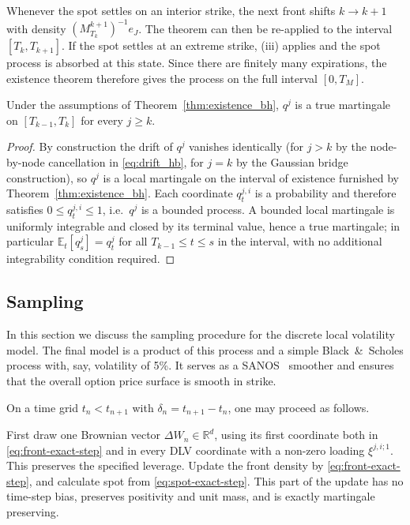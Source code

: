 \documentclass[smallextended,envcountsame,envcountsect]{svjour3}
\begin{document}
Whenever the spot settles on an interior strike, the next front shifts $k \rightarrow k +1 $ with density $(M^{k+1}_{T_k})^{-1}e_J$. The theorem can then be re-applied to the interval $[T_k, T_{k+1}]$. If the spot settles at an extreme strike, (iii) applies and the spot process is absorbed at this state. Since there are finitely many expirations, the existence theorem therefore gives the process on the full interval $[0, T_M]$. 

\begin{corollary}
\label{cor:true_martingale_mw}
Under the assumptions of Theorem~\ref{thm:existence_bh}, $q^j$ is a true martingale on $[T_{k-1},T_k]$ for every $j\geq k$.
\end{corollary}
\begin{proof}
By construction the drift of $q^j$ vanishes identically (for $j>k$ by the node-by-node cancellation in \eqref{eq:drift_hb}, for $j=k$ by the Gaussian bridge construction), so $q^j$ is a local martingale on the interval of existence furnished by Theorem~\ref{thm:existence_bh}. Each coordinate $q_t^{j,i}$ is a probability and therefore satisfies $0\leq q_t^{j,i}\leq 1$, i.e.\ $q^j$ is a bounded process. A bounded local martingale is uniformly integrable and closed by its terminal value, hence a true martingale; in particular $\mathbb E_t[q_s^j]=q_t^j$ for all $T_{k-1}\leq t\leq s$ in the interval, with no additional integrability condition required.
\end{proof}

\subsection{Sampling}
\label{sec:sampling}

  In this section we discuss the sampling procedure for the discrete local volatility model. The final model is a product of this 
  process and a simple Black~\&~Scholes process with, say, volatility of 5\%. It serves as a SANOS~\citep{SANOS2026} smoother and ensures
  that the overall option price surface is smooth in strike.

   On a time grid
  $t_n<t_{n+1}$ with $\delta_n=t_{n+1}-t_n$, one may proceed as follows.

  First draw one Brownian vector $\Delta W_n\in\mathbb R^d$, using its first
  coordinate both in \eqref{eq:front-exact-step} and in every DLV coordinate
  with a non-zero loading $\xi^{j,i;1}$. This preserves the specified leverage.
  Update the front density by \eqref{eq:front-exact-step}, and calculate spot
  from \eqref{eq:spot-exact-step}. This part of the update has no time-step
  bias, preserves positivity and unit mass, and is exactly martingale
  preserving.
\end{document}
